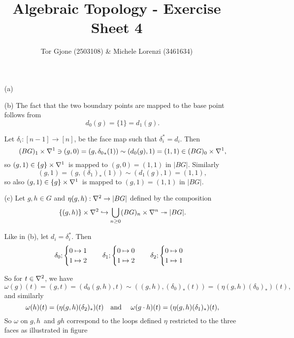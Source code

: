 \documentclass[a4paper,11pt,english]{article}
\title{\textbf{Algebraic Topology} - Exercise Sheet 4}
\author{Tor Gjone (2503108) \& Michele Lorenzi (3461634)}
\begin{document}
\mmaketitle
\begin{exercise}[1]
\begin{enumerate}
\item[(a)]

\item[(b)]
The fact that the two boundary points are mapped to the base point follows from
\[ d_0(g) = \{1\} = d_1(g). \]

Let $\delta_i: [n-1] \to [n]$, be the face map such that $\delta_i^* = d_i$.
Then 
\[ (BG)_1 \times \nabla^1 \ni (g,0) = (g,{\delta_0}_*(1)) \sim (d_0(g),1) = (1,1)
\in (BG)_0\times \nabla^1, \]
so $(g,1) \in \{g\}\times \nabla^1$ is mapped to $(g,0) = (1,1)$ in $|BG|$.
Similarly 
\[ (g,1) = (g,(\delta_1)_*(1)) \sim (d_1(g),1) = (1,1), \]
so also $(g,1) \in \{g\}\times \nabla^1$ is mapped to $(g,1) = (1,1)$ in $|BG|$.

\item[(c)]
Let $g,h \in G$ and $\eta(g,h) : \nabla^2 \to |BG|$ defined by the composition
\[ \{ (g,h) \}\times \nabla^2 \hookrightarrow \bigcup_{n\ge 0} (BG)_n \times \nabla^n \twoheadrightarrow
|BG|. \] 

Like in (b), let $d_i = \delta_i^*$. Then 
\[ 
\delta_0; \begin{cases} 0\mapsto 1 \\ 1 \mapsto 2 \end{cases} \quad 
\delta_1; \begin{cases} 0\mapsto 0 \\ 1 \mapsto 2 \end{cases} \quad 
\delta_2; \begin{cases} 0\mapsto 0 \\ 1 \mapsto 1 \end{cases} 
\]

So for $t\in \nabla^2$, we have
\[ \omega(g)(t) = (g,t) = (d_0(g,h), t) \sim
((g,h),(\delta_0)_*(t)) = (\eta(g,h) (\delta_0)_*)(t), \]
and similarly
\[ \omega(h)(t) = (\eta(g,h) (\delta_2)_*)(t) \quad\text{and }\quad
\omega(g\cdot h)(t) = (\eta(g,h) (\delta_1)_*)(t), \]
So $\omega$ on $g,h$ and $gh$ correspond to the loops defined $\eta$ restricted
to the three faces as illustrated in figure 


\newcommand{\arrowIn}{
\tikz \draw[-to] (-1pt,0) -- (1pt,0);
}


\end{enumerate}
\end{exercise}
\end{document}
